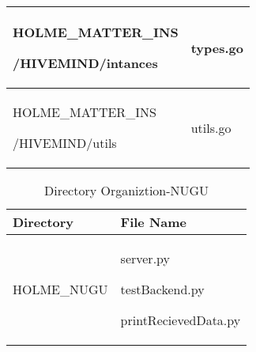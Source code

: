 \documentclass[conference]{IEEEtran}
\begin{document}
\begin{table}[h]
\begin{tabular}{|p{3.9cm}|p{3.9cm}|}
          HOLME\_MATTER\_INS\par/HIVEMIND/intances & types.go\\ \hline
          HOLME\_MATTER\_INS\par/HIVEMIND/utils & utils.go\\ \hline
	\end{tabular}
\end{table}

\begin{table}[h]
\caption{Directory Organiztion-NUGU}
\def\arraystretch{1.24} \small
    \begin{tabular}{|p{3.9cm}|p{3.9cm}|}
        \hline
        Directory & File Name \\ \hline
          HOLME\_NUGU & server.py\par testBackend.py\par printRecievedData.py\\ \hline
	\end{tabular}
\end{table}
\clearpage
\end{document}
